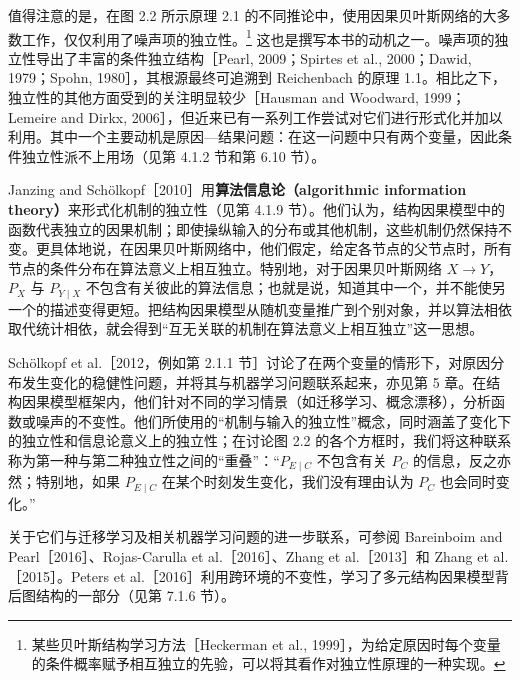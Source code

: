 值得注意的是，在图 2.2 所示原理 2.1 的不同推论中，使用因果贝叶斯网络的大多数工作，仅仅利用了噪声项的独立性。\footnote{某些贝叶斯结构学习方法［Heckerman et al., 1999］，为给定原因时每个变量的条件概率赋予相互独立的先验，可以将其看作对独立性原理的一种实现。}
这也是撰写本书的动机之一。噪声项的独立性导出了丰富的条件独立结构［Pearl, 2009；Spirtes et al., 2000；Dawid, 1979；Spohn, 1980］，其根源最终可追溯到 Reichenbach 的原理 1.1。相比之下，独立性的其他方面受到的关注明显较少［Hausman and Woodward, 1999；Lemeire and Dirkx, 2006］，但近来已有一系列工作尝试对它们进行形式化并加以利用。其中一个主要动机是原因—结果问题：在这一问题中只有两个变量，因此条件独立性派不上用场（见第 4.1.2 节和第 6.10 节）。

Janzing and Schölkopf［2010］用\textbf{算法信息论（algorithmic information theory）}来形式化机制的独立性（见第 4.1.9 节）。他们认为，结构因果模型中的函数代表独立的因果机制；即使操纵输入的分布或其他机制，这些机制仍然保持不变。更具体地说，在因果贝叶斯网络中，他们假定，给定各节点的父节点时，所有节点的条件分布在算法意义上相互独立。特别地，对于因果贝叶斯网络 $X\to Y$，$P_X$ 与 $P_{Y\mid X}$ 不包含有关彼此的算法信息；也就是说，知道其中一个，并不能使另一个的描述变得更短。把结构因果模型从随机变量推广到个别对象，并以算法相依取代统计相依，就会得到“互无关联的机制在算法意义上相互独立”这一思想。

Schölkopf et al.［2012，例如第 2.1.1 节］讨论了在两个变量的情形下，对原因分布发生变化的稳健性问题，并将其与机器学习问题联系起来，亦见第 5 章。在结构因果模型框架内，他们针对不同的学习情景（如迁移学习、概念漂移），分析函数或噪声的不变性。他们所使用的“机制与输入的独立性”概念，同时涵盖了变化下的独立性和信息论意义上的独立性；在讨论图 2.2 的各个方框时，我们将这种联系称为第一种与第二种独立性之间的“重叠”：“$P_{E\mid C}$ 不包含有关 $P_C$ 的信息，反之亦然；特别地，如果 $P_{E\mid C}$ 在某个时刻发生变化，我们没有理由认为 $P_C$ 也会同时变化。”

关于它们与迁移学习及相关机器学习问题的进一步联系，可参阅 Bareinboim and Pearl［2016］、Rojas-Carulla et al.［2016］、Zhang et al.［2013］和 Zhang et al.［2015］。Peters et al.［2016］利用跨环境的不变性，学习了多元结构因果模型背后图结构的一部分（见第 7.1.6 节）。
\FloatBarrier
